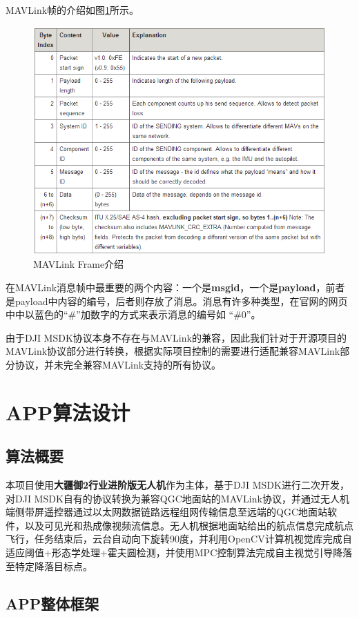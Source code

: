MAVLink帧的介绍如图\ref{Fig:img8}所示。

\begin{figure}[ht]
  \centering
  \includegraphics[width=0.8\linewidth]{./Figure/Mavlink_Frame_Intro.png}
  \caption{MAVLink Frame介绍}\label{Fig:img8}
\end{figure}

在MAVLink消息帧中最重要的两个内容：一个是\textbf{msgid}，一个是\textbf{payload}，前者是payload中内容的编号，后者则存放了消息。消息有许多种类型，在官网的网页中中以蓝色的“\#”加数字的方式来表示消息的编号如 “\#0”。

由于DJI MSDK协议本身不存在与MAVLink的兼容，因此我们针对于开源项目的MAVLink协议部分进行转换，根据实际项目控制的需要进行适配兼容MAVLink部分协议，并未完全兼容MAVLink支持的所有协议。

\chapter{APP算法设计}

\section{算法概要}

本项目使用\textbf{大疆御2行业进阶版无人机}作为主体，基于DJI MSDK进行二次开发，对DJI MSDK自有的协议转换为兼容QGC地面站的MAVLink协议，并通过无人机端侧带屏遥控器通过以太网数据链路远程组网传输信息至远端的QGC地面站软件，以及可见光和热成像视频流信息。无人机根据地面站给出的航点信息完成航点飞行，任务结束后，云台自动向下旋转90度，并利用OpenCV计算机视觉库完成自适应阈值+形态学处理+霍夫圆检测，并使用MPC控制算法完成自主视觉引导降落至特定降落目标点。

\section{APP整体框架}

